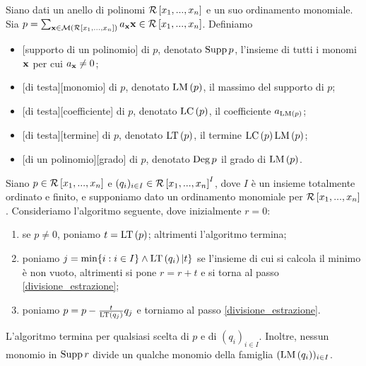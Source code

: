 \begin{Definition}\label{polinomi_definizionitesta}
	Siano dati un anello di polinomi $\mathcal{R} \left [ x_1, ..., x_n \right ]$ e un suo ordinamento monomiale. Sia $p = \sum_{\mathbf{x} \in \mathcal{M}\left ( \mathcal{R} \left [ x_1, ..., x_n \right ] \right )} a_{\mathbf{x}} \mathbf{x} \in \mathcal{R} \left [ x_1, ..., x_n \right ]$. Definiamo
	\begin{itemize}
		\item {}[supporto di un polinomio] di $p$, denotato $\operatorname{Supp}{p}$, l'insieme di tutti i monomi $\mathbf{x}$ per cui $a_{\mathbf{x}} \neq 0$;
		\item {}[di testa][monomio] di $p$, denotato $\text{LM} \left ( p \right )$, il massimo del supporto di $p$;
		\item {}[di testa][coefficiente] di $p$, denotato $\text{LC} \left ( p \right )$, il coefficiente $a_{\text{LM} \left ( p \right )}$;
		\item {}[di testa][termine] di $p$, denotato $\text{LT} \left ( p \right )$, il termine $\text{LC} \left ( p \right )\text{LM} \left ( p \right )$;
		\item {}[di un polinomio][grado] di $p$, denotato $\operatorname{Deg}{p}$ il grado di $\text{LM} \left ( p \right )$.
	\end{itemize}
\end{Definition}
\begin{Theorem}\label{teorema_divisione_polinomi}
	Siano $p \in \mathcal{R} \left [ x_1, ..., x_n \right ]$ e $(q_i)_{i \in I} \in \mathcal{R} \left [ x_1, ..., x_n \right ]^I$, dove $I$ \`e un insieme totalmente ordinato e finito, e supponiamo dato un ordinamento monomiale per $\mathcal{R} \left [ x_1, ..., x_n \right ]$. Consideriamo l'algoritmo seguente, dove inizialmente $r = 0$:
	\begin{enumerate}
		\item se $p \neq 0$, poniamo $t = \text{LT} \left ( p \right )$; altrimenti l'algoritmo termina;\label{divisione_estrazione}
		\item poniamo $j = \min \lbrace i: i \in I \rbrace \wedge \text{LT} \left ( q_i \right )|t \rbrace$ se l'insieme di cui si calcola il minimo \`e non vuoto, altrimenti si pone $r = r + t$ e si torna al passo \ref{divisione_estrazione};\label{divisione_ricerca}
		\item poniamo $p = p - \frac{t}{\text{LT} \left ( q_j \right )} q_j$ e torniamo al passo \ref{divisione_estrazione}.\label{divisione_somma}
	\end{enumerate}
	L'algoritmo termina per qualsiasi scelta di $p$ e di $(q_i)_{i \in I}$. Inoltre, nessun monomio in $\operatorname{Supp}{r}$ divide un qualche monomio della famiglia $(\text{LM} \left ( q_i \right ))_{i \in I}$.
\end{Theorem}
